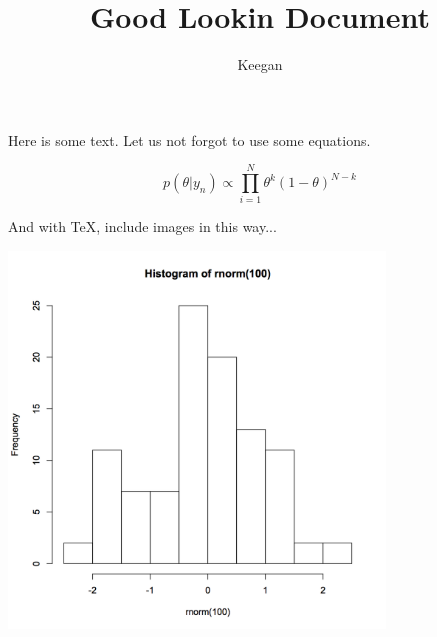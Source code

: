 \documentclass{article}
\title{Good Lookin Document}
\author{Keegan}
\begin{document}
\maketitle

Here is some text. Let us not forgot to use some equations.

\[
p(\theta|y_n) \propto \prod_{i=1}^N \theta^{k} (1-\theta)^{N-k}
\]

And with TeX, include images in this way...

\includegraphics[width=10cm]{image.png}
\end{document}
